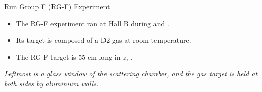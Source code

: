 \begin{frame}{Run Group F (RG-F) Experiment}
    \label{10.41::rgf_experiment}

    \begin{itemize}
        \item
            The RG-F experiment ran at Hall B during  and .

        \vspace{12pt}
        \item
            Its target is composed of a D2 gas at room temperature.

        \vspace{12pt}
        \item
            The RG-F target is 55 cm long in $z$, .
    \end{itemize}

    \vspace{-6pt}

    \begin{center}
        \begin{figure}[t]
        \end{figure}
    \end{center}

    \vspace{-6pt}

    \scriptsize{\textit{
        Leftmost is a glass window of the scattering chamber, and the gas target is held at both sides by aluminium walls.
    }}
\end{frame}
